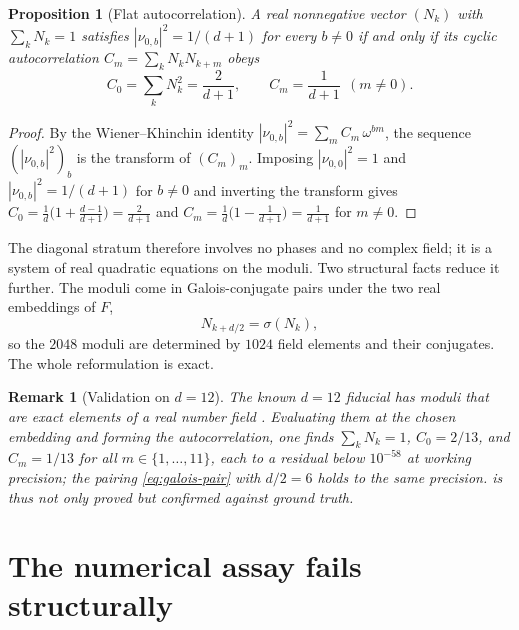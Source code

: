 \documentclass[12pt,a4paper]{article}
\newtheorem{proposition}[theorem]{Proposition}
\newtheorem{remark}[theorem]{Remark}
\newcommand{\Fd}{F}
\begin{document}
\begin{proposition}[Flat autocorrelation]
\label{prop:autocorr}
A real nonnegative vector $(N_k)$ with $\sum_k N_k = 1$ satisfies
$|\nu_{0,b}|^2 = 1/(d+1)$ for every $b\neq 0$ if and only if its cyclic
autocorrelation $C_m = \sum_k N_k N_{k+m}$ obeys
\[
C_0 = \sum_k N_k^2 = \frac{2}{d+1},
\qquad
C_m = \frac{1}{d+1}\ \ (m\neq 0).
\]
\end{proposition}

\begin{proof}
By the Wiener--Khinchin identity $|\nu_{0,b}|^2 = \sum_m C_m\,\omega^{bm}$, the
sequence $(|\nu_{0,b}|^2)_b$ is the transform of $(C_m)_m$.  Imposing
$|\nu_{0,0}|^2 = 1$ and $|\nu_{0,b}|^2 = 1/(d+1)$ for $b\neq 0$ and inverting the
transform gives $C_0 = \tfrac1d\big(1 + \tfrac{d-1}{d+1}\big) = \tfrac{2}{d+1}$
and $C_m = \tfrac1d\big(1 - \tfrac{1}{d+1}\big) = \tfrac1{d+1}$ for $m\neq 0$.
\end{proof}

The diagonal stratum therefore involves no phases and no complex field; it is a
system of real quadratic equations on the moduli.  Two structural facts reduce it
further.  The moduli come in Galois-conjugate pairs under the two real
embeddings of $\Fd$,
\begin{equation}
\label{eq:galois-pair}
N_{k+d/2} = \sigma(N_k),
\end{equation}
so the $2048$ moduli are determined by $1024$ field elements and their
conjugates.  The whole reformulation is exact.

\begin{remark}[Validation on $d=12$]
\label{rem:d12-autocorr}
The known $d=12$ fiducial has moduli that are exact elements of a real number
field \cite{Appleby2013}.  Evaluating them at the chosen embedding and forming
the autocorrelation, one finds $\sum_k N_k = 1$, $C_0 = 2/13$, and
$C_m = 1/13$ for all $m\in\{1,\dots,11\}$, each to a residual below $10^{-58}$
at working precision; the pairing \eqref{eq:galois-pair} with $d/2=6$ holds to
the same precision.   is thus not only proved but confirmed
against ground truth.
\end{remark}

\section{The numerical assay fails structurally}
\label{sec:numeric}
\end{document}
